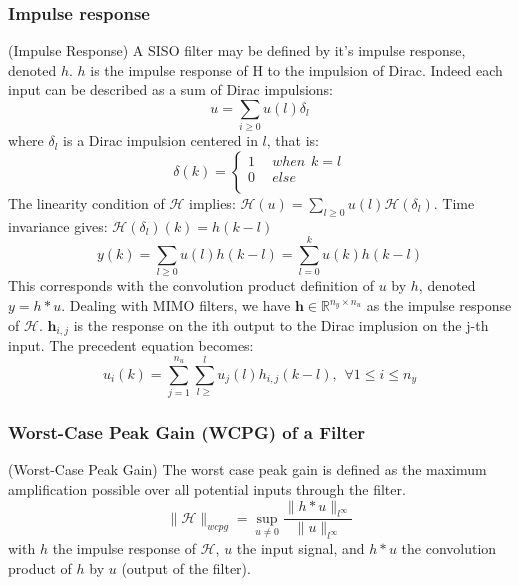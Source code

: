 	\subsubsection{Impulse response}
	\begin{thdef} (Impulse Response)
	A SISO filter may be defined by it’s impulse response, denoted $h$. $h$ is the
	impulse response of H to the impulsion of Dirac.
	Indeed each input can be described as a sum of Dirac impulsions:
	$$u=\sum_{i\geq0}u(l)\delta_l$$
	where $\delta_l$ is a Dirac impulsion centered in $l$, that is:
	\begin{equation}
		\delta(k) =
		\begin{cases}
			1 & \hspace{5pt} when \hspace{5pt} k=l\\
			0 & \hspace{5pt} else\\
		\end{cases}
	\end{equation}
	The linearity condition of $\mathcal{H}$ implies: $\mathcal{H}(u) = \sum_{l\geq0}u(l)\mathcal{H}(\delta_l)$.
	Time invariance gives: $\mathcal{H}(\delta_l)(k)=h(k-l)$
	$$y(k)=\sum_{l\geq0}u(l)h(k-l)=\sum_{l=0}^ku(k)h(k-l)$$
	This corresponds with the convolution product definition of $u$ by $h$, denoted $y = h * u$.
	Dealing with MIMO filters, we have $\boldsymbol{h} \in \mathbb{R}^{n_y \times n_u}$ as the impulse response of $\mathcal{H}$. $\boldsymbol{h}_{i,j}$ is the response on the
	ith output to the Dirac implusion on the j-th input.
	The precedent equation becomes:
	$$u_i(k)=\sum_{j=1}^{n_u}\sum_{l\geq}^lu_j(l)h_{i,j}(k-l), \hspace{5pt} \forall 1 \leq i \leq n_y$$
	
	\end{thdef} 

	\subsubsection{Worst-Case Peak Gain (WCPG) of a Filter}
	\begin{thdef} (Worst-Case Peak Gain)
		The worst case peak gain is defined as the maximum amplification
		possible over all potential inputs through the filter.
		$$\|\mathcal{H}\|_{wcpg}=\sup_{u\neq0}\frac{\|h*u\|_{l^{\infty}}}{\|u\|_{l^{\infty}}}$$
		with $h$ the impulse response of $\mathcal{H}$, $u$ the input signal, and $h * u$ the convolution product of $h$ by $u$ (output of the
				filter).
	
	\end{thdef}

